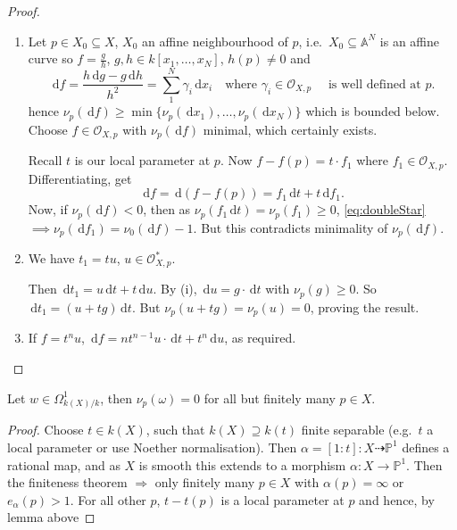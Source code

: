 \documentclass{article}
\newcommand{\A}{\mathbb{A}}
\newcommand{\proj}{\mathbb{P}}
\newcommand{\diff}{\,\textrm{d}}
\begin{document}
\begin{proof}
    \begin{enumerate}[label=(\alph*)]
        \item Let $p \in X_0 \subseteq X$, $X_0$ an affine neighbourhood of $p$, i.e.\ $X_0 \subseteq \A^N$ is an affine curve so $f = \frac{g}{h}$, $g, h \in k[x_1, \dotsc, x_N]$, $h(p) \neq 0$ and
            \begin{equation*}
                \diff f = \frac{h \diff g - g \diff h}{h^2} = \sum_1^N \gamma_i \diff x_i \quad \text{where } \gamma_i \in \mathcal{O}_{X, p} \quad \text{ is well defined at } p.
            \end{equation*}
            hence $\nu_p(\diff f) \geq \min\{ \nu_p(\diff x_1), \dotsc, \nu_p(\diff x_N)\}$ which is bounded below.
            Choose $f \in \mathcal{O}_{X, p}$ with $\nu_p(\diff f)$ minimal, which certainly exists.

            Recall $t$ is our local parameter at $p$. Now $f - f(p) = t \cdot f_1$ where $f_1 \in \mathcal{O}_{X, p}$.
            Differentiating, get
            \begin{equation*}\diff f = \diff(f - f(p)) = f_1 \diff t + t \diff f_1. \label{eq:doubleStar}\end{equation*}
            Now, if $\nu_p(\diff f) < 0$, then as $\nu_p(f_1 \diff t) = \nu_p(f_1) \geq 0$, \eqref{eq:doubleStar} $\implies \nu_p(\diff f_1) = \nu_0(\diff f) - 1$. But this contradicts minimality of $\nu_p(\diff f)$.
        \item We have $t_1 = tu$, $u \in \mathcal{O}_{X, p}^*$.

            Then $\diff t_1 = u \diff t + t \diff u$. By (i), $\diff u = g \cdot \diff t$ with $\nu_p(g) \geq 0$.
            So $\diff t_1 = (u + t g) \diff t$. But $\nu_p(u + t g) = \nu_p(u) = 0$, proving the result.
        \item If $f = t^n u$, $\diff f = n t^{n-1} u \cdot \diff t + t^n \diff u$, as required.
    \end{enumerate}
\end{proof}
\begin{lemma}
    Let $w \in \Omega^1_{k(X)/k}$, then $\nu_p(\omega) = 0$ for all but finitely many $p \in X$.
\end{lemma}
\begin{proof}
    Choose $t \in k(X)$, such that $k(X) \supseteq k(t)$ finite separable (e.g.\ $t$ a local parameter or use Noether normalisation).
    Then $\alpha = [1:t]: X \dashrightarrow \proj^1$ defines a rational map,
    and as $X$ is smooth this extends to a morphism $\alpha: X \to \proj^1$.
    Then the finiteness theorem $\Rightarrow$ only finitely many $p \in X$ with $\alpha(p) = \infty$ or $e_\alpha(p) > 1$.
    For all other $p$, $t - t(p)$ is a local parameter at $p$ and hence, by lemma above
\end{proof}
\end{document}

